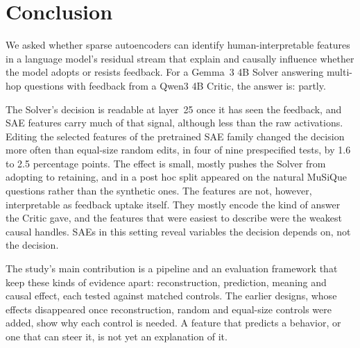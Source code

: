 \chapter{Conclusion}
\label{chap:conclusion}

We asked whether sparse autoencoders can identify human-interpretable features
in a language model's residual stream that explain and causally influence
whether the model adopts or resists feedback. For a Gemma~3 4B Solver
answering multi-hop questions with feedback from a Qwen3 4B Critic, the answer
is: partly.

The Solver's decision is readable at layer~25 once it has seen the feedback,
and SAE features carry much of that signal, although less than the raw
activations. Editing the selected features of the pretrained SAE family
changed the decision more often than equal-size random edits, in four of nine
prespecified tests, by 1.6 to 2.5 percentage points. The effect is small,
mostly pushes the Solver from adopting to retaining, and in a post hoc split
appeared on the natural MuSiQue questions rather than the synthetic ones. The features are
not, however, interpretable as feedback uptake itself. They mostly encode the
kind of answer the Critic gave, and the features that were easiest to describe
were the weakest causal handles. SAEs in this setting reveal variables the
decision depends on, not the decision.

The study's main contribution is a pipeline and an evaluation framework that
keep these kinds of evidence apart: reconstruction, prediction, meaning and
causal effect, each tested against matched controls. The earlier designs,
whose effects disappeared once reconstruction, random and equal-size controls
were added, show why each control is needed. A feature that predicts a
behavior, or one that can steer it, is not yet an explanation of it.
